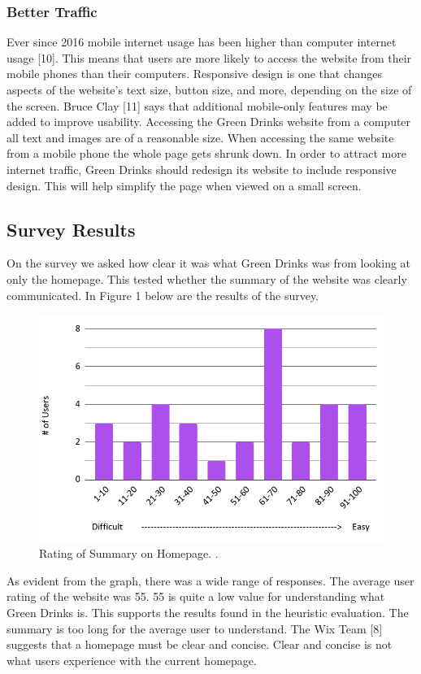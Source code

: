 \documentclass[12pt]{article}
\begin{document}
\subsubsection*{Better Traffic}
Ever since 2016 mobile internet usage has been higher than computer internet usage [10]. This means that users are more likely to access the website from their mobile phones than their computers. Responsive design is one that changes aspects of the website’s text size, button size, and more, depending on the size of the screen.  Bruce Clay [11] says that additional mobile-only features may be added to improve usability. 
Accessing the Green Drinks website from a computer all text and images are of a reasonable size. When accessing the same website from a mobile phone the whole page gets shrunk down. In order to attract more internet traffic, Green Drinks should redesign its website to include responsive design. This will help simplify the page when viewed on a small screen.

\subsection{Survey Results}
On the survey we asked how clear it was what Green Drinks was from looking at only the homepage. This tested whether the summary of the website was clearly communicated. In Figure 1 below are the results of the survey.



\begin{figure}[ht]
\centering
\includegraphics[width=1.0\textwidth]{f1}
\caption[Rating of Summary on Homepage. ]{Rating of Summary on Homepage. \footnotemark.}
\end{figure}
As evident from the graph, there was a wide range of responses. The average user rating of the website was 55. 55 is quite a low value for understanding what Green Drinks is. This supports the results found in the heuristic evaluation. The summary is too long for the average user to understand. The Wix Team [8] suggests that a homepage must be clear and concise. Clear and concise is not what users experience with the current homepage.
\end{document}
